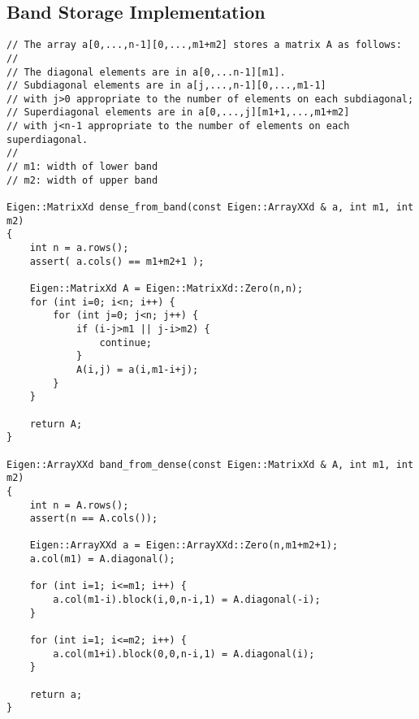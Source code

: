 \documentclass[paper=a4, fontsize=11pt]{scrartcl} %
\numberwithin{equation}{section} %
\numberwithin{figure}{section} %
\numberwithin{table}{section} %
\begin{document}
\subsection{Band Storage Implementation}
\begin{lstlisting}
// The array a[0,...,n-1][0,...,m1+m2] stores a matrix A as follows: 
//
// The diagonal elements are in a[0,...n-1][m1]. 
// Subdiagonal elements are in a[j,...,n-1][0,...,m1-1] 
// with j>0 appropriate to the number of elements on each subdiagonal;
// Superdiagonal elements are in a[0,...,j][m1+1,...,m1+m2]
// with j<n-1 appropriate to the number of elements on each superdiagonal.
//
// m1: width of lower band
// m2: width of upper band

Eigen::MatrixXd dense_from_band(const Eigen::ArrayXXd & a, int m1, int m2)
{
    int n = a.rows();
    assert( a.cols() == m1+m2+1 );

    Eigen::MatrixXd A = Eigen::MatrixXd::Zero(n,n);
    for (int i=0; i<n; i++) {
        for (int j=0; j<n; j++) {
            if (i-j>m1 || j-i>m2) {
                continue;
            }
            A(i,j) = a(i,m1-i+j);
        }
    }

    return A;
}

Eigen::ArrayXXd band_from_dense(const Eigen::MatrixXd & A, int m1, int m2)
{
    int n = A.rows();
    assert(n == A.cols());

    Eigen::ArrayXXd a = Eigen::ArrayXXd::Zero(n,m1+m2+1);
    a.col(m1) = A.diagonal();

    for (int i=1; i<=m1; i++) {
        a.col(m1-i).block(i,0,n-i,1) = A.diagonal(-i);
    }

    for (int i=1; i<=m2; i++) {
        a.col(m1+i).block(0,0,n-i,1) = A.diagonal(i);
    }

    return a;
}
\end{lstlisting}
\newpage
\end{document}
